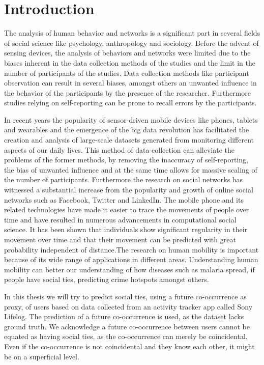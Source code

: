 \chapter{Introduction}
\label{chap:Introduction}

The analysis of human behavior and networks is a significant part in several fields of social science like psychology, anthropology and sociology. Before the advent of sensing devices, the analysis of behaviors and networks were limited due to the biases inherent in the data collection methods of the studies and the limit in the number of participants of the studies. Data collection methods like participant observation can result in several biases, amongst others an unwanted influence in the behavior of the participants by the presence of the researcher\cite{rosenthal1966experimenter}. Furthermore studies relying on self-reporting can be prone to recall errors by the participants\cite{stone1999science}\cite{bernard1980informant}.

In recent years the popularity of sensor-driven mobile devices like phones, tablets and wearables and the emergence of the big data revolution has facilitated the creation and analysis of large-scale datasets generated from monitoring different aspects of our daily lives\cite{lazer2009life}. This method of data-collection can alleviate the problems of the former methods, by removing the inaccuracy of self-reporting, the bias of unwanted influence and at the same time allows for massive scaling of the number of participants. Furthermore the research on social networks has witnessed a substantial increase from the popularity and growth of online social networks such as Facebook, Twitter and LinkedIn\cite{social_networks}. The mobile phone and its related technologies have made it easier to trace the movements of people over time and have resulted in numerous advancements in computational social science. It has been shown that individuals show significant regularity in their movement over time\cite{gonzalez2008understanding} and that their movement can be predicted with great probability independent of distance\cite{song2010limits}.The research on human mobility is important because of its wide range of applications in different areas. Understanding human mobility can better our understanding of how diseases such as malaria spread\cite{wesolowski2012quantifying}, if people have social ties\cite{crandall2010inferring}, predicting crime hotspots\cite{bogomolov2014once} amongst others.

In this thesis we will try to predict social ties, using a future co-occurrence as proxy, of users based on data collected from an activity tracker app called Sony Lifelog\cite{sonyLifeLog}. The prediction of a future co-occurrence is used, as the dataset lacks ground truth. We acknowledge a future co-occurrence between users cannot be equated as having social ties, as the co-occurrence can merely be coincidental. Even if the co-occurrence is not coincidental and they know each other, it might be on a superficial level.

